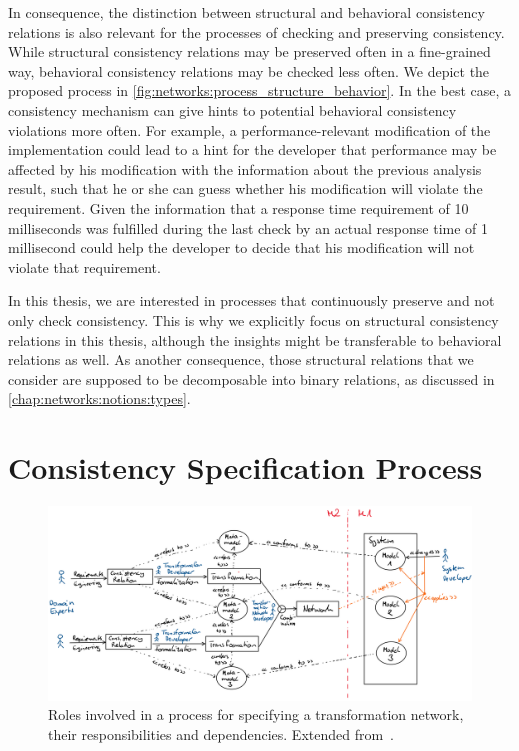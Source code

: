 In consequence, the distinction between structural and behavioral consistency relations is also relevant for the processes of checking and preserving consistency.
While structural consistency relations may be preserved often in a fine-grained way, behavioral consistency relations may be checked less often.
We depict the proposed process in \autoref{fig:networks:process_structure_behavior}.
In the best case, a consistency mechanism can give hints to potential behavioral consistency violations more often.
For example, a performance-relevant modification of the implementation could lead to a hint for the developer that performance may be affected by his modification with the information about the previous analysis result, such that he or she can guess whether his modification will violate the requirement.
Given the information that a response time requirement of 10 milliseconds was fulfilled during the last check by an actual response time of 1 millisecond could help the developer to decide that his modification will not violate that requirement.

In this thesis, we are interested in processes that continuously preserve and not only check consistency.
This is why we explicitly focus on structural consistency relations in this thesis, although the insights might be transferable to behavioral relations as well.
As another consequence, those structural relations that we consider are supposed to be decomposable into binary relations, as discussed in \autoref{chap:networks:notions:types}.



\section{Consistency Specification Process}
\label{chap:networks:specification_process}

\begin{figure}
    \centering
    \includegraphics[width=\textwidth]{figures/prologue/networks/roles_and_process}
    \caption[Roles in a transformation network specification process]{Roles involved in a process for specifying a transformation network, their responsibilities and dependencies. Extended from~.}
    \label{fig:networks:roles_and_process}
\end{figure}

